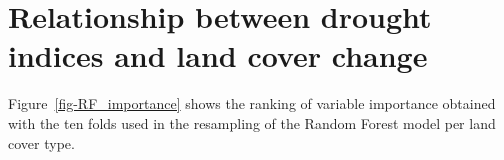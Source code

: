 \documentclass[
  authoryear,
  preprint,
  3p,
  onecolumn]{elsarticle}
\begin{document}
\section{Relationship between drought indices and land cover
change}\label{relationship-between-drought-indices-and-land-cover-change}

Figure~\ref{fig-RF_importance} shows the ranking of variable importance
obtained with the ten folds used in the resampling of the Random Forest
model per land cover type.

\begin{figure}[!ht]

\begin{minipage}{0.33\linewidth}



\end{minipage}%
%
\begin{minipage}{0.33\linewidth}

\centering{

}
\end{minipage}
\end{figure}
\end{document}
